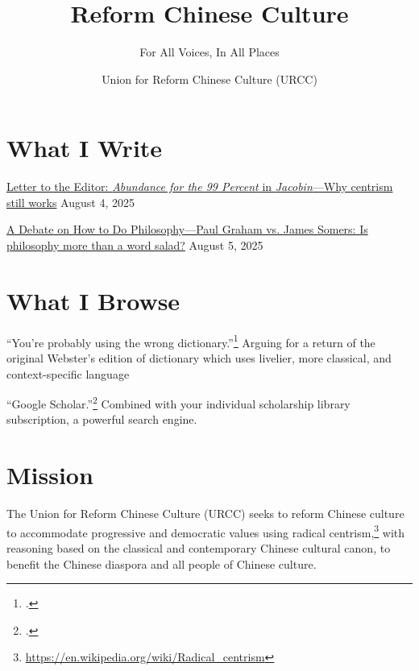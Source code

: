\documentclass[12pt]{article}
\begin{document}
\title{Reform Chinese Culture}
\subtitle{For All Voices, In All Places}
\author{Union for Reform Chinese Culture (URCC)}

\maketitle

\section{What I Write}
\href{202508Abundance.html}{Letter to the Editor: \textit{Abundance for the 99 Percent} in \textit{Jacobin}---Why centrism still works} August 4, 2025

\href{202508DebateOnPhilosophyPaulGrahamPG.html}{A Debate on How to Do
Philosophy---Paul Graham vs. James Somers: Is philosophy more than a word salad?} August 5, 2025

\section{What I Browse}

\enquote{You're probably using the wrong dictionary.}\footcite{somerYoureProbablyUsing} Arguing for a return of the original Webster's edition of dictionary which uses livelier, more classical, and context-specific language

\enquote{Google Scholar.}\footcite{googleGoogleScholar} Combined with your individual scholarship library subscription, a powerful search engine.

\section{Mission}

The Union for Reform Chinese Culture (URCC) seeks to reform Chinese culture to accommodate progressive and democratic values using radical centrism,\footnote{\href{https://en.wikipedia.org/wiki/Radical\_centrism}{https://en.wikipedia.org/wiki/Radical\_centrism}} with reasoning based on the classical and contemporary Chinese cultural canon, to benefit the Chinese diaspora and all people of Chinese culture.


\end{document}
